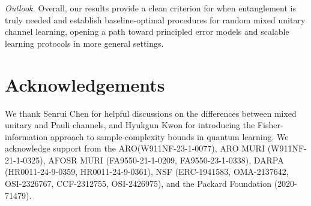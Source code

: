 \documentclass[12pt]{article}
\begin{document}
\textit{Outlook.} Overall, our results provide a clean criterion for when entanglement is truly needed and establish baseline\mbox{-}optimal procedures for random mixed unitary channel learning, opening a path toward principled error models and scalable learning protocols in more general settings.


\section*{Acknowledgements}

We thank Senrui Chen for helpful discussions on the differences between mixed unitary and Pauli channels, and Hyukgun Kwon for introducing the Fisher-information approach to sample-complexity bounds in quantum learning. We acknowledge support from the ARO(W911NF-23-1-0077), ARO MURI (W911NF-21-1-0325), AFOSR MURI (FA9550-21-1-0209, FA9550-23-1-0338), DARPA (HR0011-24-9-0359, HR0011-24-9-0361), NSF (ERC-1941583, OMA-2137642, OSI-2326767, CCF-2312755, OSI-2426975), and the Packard Foundation (2020-71479).
\end{document}
